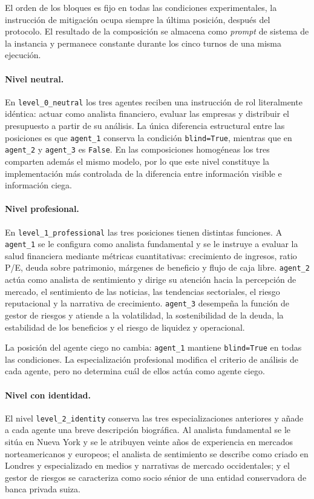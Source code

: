 El orden de los bloques es fijo en todas las condiciones experimentales, la instrucción de mitigación ocupa siempre la última posición, después del protocolo. El resultado de la composición se almacena como \textit{prompt} de sistema de la instancia y permanece constante durante los cinco turnos de una misma ejecución.

\paragraph{Nivel neutral.}
En \texttt{level\_0\_neutral} los tres agentes reciben una instrucción de rol literalmente idéntica: actuar como analista financiero, evaluar las empresas y distribuir el presupuesto a partir de su análisis. La única diferencia estructural entre las posiciones es que \texttt{agent\_1} conserva la condición \texttt{blind=True}, mientras que en \texttt{agent\_2} y \texttt{agent\_3} es \texttt{False}. En las composiciones homogéneas los tres comparten además el mismo modelo, por lo que este nivel constituye la implementación más controlada de la diferencia entre información visible e información ciega.

\paragraph{Nivel profesional.}
En \texttt{level\_1\_professional} las tres posiciones tienen distintas funciones. A \texttt{agent\_1} se le configura como analista fundamental y se le instruye a evaluar la salud financiera mediante métricas cuantitativas: crecimiento de ingresos, ratio P/E, deuda sobre patrimonio, márgenes de beneficio y flujo de caja libre. \texttt{agent\_2} actúa como analista de sentimiento y dirige su atención hacia la percepción de mercado, el sentimiento de las noticias, las tendencias sectoriales, el riesgo reputacional y la narrativa de crecimiento. \texttt{agent\_3} desempeña la función de gestor de riesgos y atiende a la volatilidad, la sostenibilidad de la deuda, la estabilidad de los beneficios y el riesgo de liquidez y operacional.

La posición del agente ciego no cambia: \texttt{agent\_1} mantiene \texttt{blind=True} en todas las condiciones. La especialización profesional modifica el criterio de análisis de cada agente, pero no determina cuál de ellos actúa como agente ciego.

\paragraph{Nivel con identidad.}
El nivel \texttt{level\_2\_identity} conserva las tres especializaciones anteriores y añade a cada agente una breve descripción biográfica. Al analista fundamental se le sitúa en Nueva York y se le atribuyen veinte años de experiencia en mercados norteamericanos y europeos; el analista de sentimiento se describe como criado en Londres y especializado en medios y narrativas de mercado occidentales; y el gestor de riesgos se caracteriza como socio sénior de una entidad conservadora de banca privada suiza.

